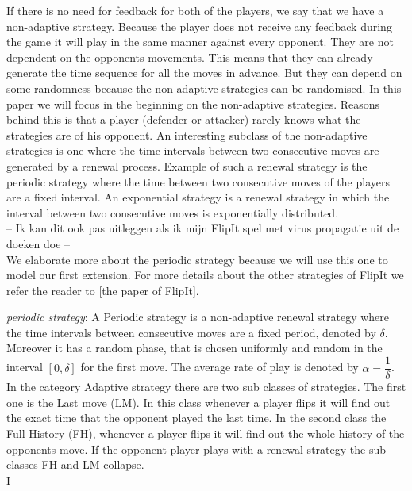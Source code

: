 If there is no need for feedback for both of the players, we say that we have a non-adaptive strategy. Because the player does not receive any feedback during the game it will play in the same manner against every opponent. They are not dependent on the opponents movements. This means that they can already generate the time sequence for all the moves in advance.  But they can depend on some randomness because the non-adaptive strategies can be randomised. 
In this paper we will focus in the beginning on the non-adaptive strategies. Reasons behind this is that a player (defender or attacker) rarely knows what the strategies are of his opponent. An interesting subclass of the non-adaptive strategies is one where the time intervals between two consecutive moves are generated by a renewal process. Example of such a renewal strategy is the periodic strategy where the time between two consecutive moves of the players are a fixed interval. An exponential strategy is a renewal strategy in which the interval between two consecutive moves is exponentially distributed.  \\

-- Ik kan dit ook pas uitleggen als ik mijn FlipIt spel met virus propagatie uit de doeken doe -- \\
We elaborate more about the periodic strategy because we will use this one to model our first extension. For more details about the other strategies of FlipIt we refer the reader to [the paper of FlipIt].

\textit{periodic strategy}: A Periodic strategy is a non-adaptive renewal strategy where the time intervals between consecutive moves are a fixed period, denoted by $\delta$. Moreover it has a random phase, that is chosen uniformly and random in the interval $[0,\delta]$ for the first move. The average rate of play is denoted by $\alpha = \dfrac{1}{\delta}$. \\

In the category Adaptive strategy there are two sub classes of strategies. The first one is the Last move (LM). In this class whenever a player flips it will find out the exact time that the opponent played the last time. In the second class the Full History (FH), whenever a player flips it will find out the whole history of the opponents move. If the opponent player plays with a renewal strategy the sub classes FH and LM collapse. \\
 I%


